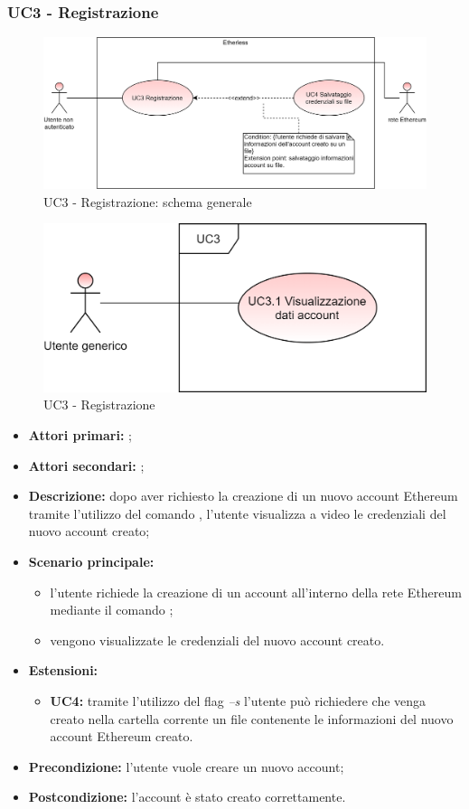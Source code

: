 \subsubsection{UC3 - Registrazione}
\begin{figure}[h]
	\centering
	\includegraphics[scale=\ucs]{./res/img/UC3G.png}
	\caption {UC3 - Registrazione: schema generale}
\end{figure}
\begin{figure}[h]
	\centering
	\includegraphics[scale=\ucs]{./res/img/UC3.png}
	\caption {UC3 - Registrazione}
\end{figure}
\begin{itemize}
	\item \textbf{Attori primari:} \una{};
	\item \textbf{Attori secondari:} \re{};
	\item \textbf{Descrizione:} dopo aver richiesto la creazione di un nuovo account Ethereum tramite l’utilizzo del comando \signup{}, l’utente visualizza a video le credenziali del nuovo account creato; 
	\item \textbf{Scenario principale:}
	\begin{itemize}
		\item l’utente richiede la creazione di un account all’interno della rete Ethereum mediante il comando \signup{};
		\item vengono visualizzate le credenziali del nuovo account creato. 
	\end{itemize}
	\item \textbf{Estensioni:} 
	\begin{itemize}
		\item \textbf{UC4:} tramite l’utilizzo del flag \textit{–s} l’utente può richiedere che venga creato nella cartella corrente un file contenente le informazioni del nuovo account Ethereum creato.
	\end{itemize}
	\item \textbf{Precondizione:} l'utente vuole creare un nuovo account; 
	\item \textbf{Postcondizione:} l’account è stato creato correttamente. 
\end{itemize}